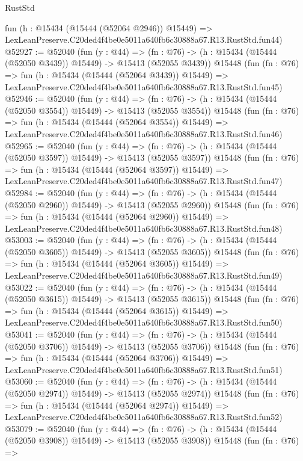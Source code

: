 \begin{lexlean}{RustStd}
\begin{coremodule}
    fun (h : @15434 (@15444 (@52064 @2946)) @15449) =>
    LexLeanPreserve.C20ded4f4be0e5011a640fb6c30888a67.R13.RustStd.fun44)
@52927 := @52040
    (fun (y : @44) =>
    (fn : @76) -> (h : @15434 (@15444 (@52050 @3439)) @15449) -> @15413 (@52055 @3439))
    @15448
    (fun (fn : @76) =>
    fun (h : @15434 (@15444 (@52064 @3439)) @15449) =>
    LexLeanPreserve.C20ded4f4be0e5011a640fb6c30888a67.R13.RustStd.fun45)
@52946 := @52040
    (fun (y : @44) =>
    (fn : @76) -> (h : @15434 (@15444 (@52050 @3554)) @15449) -> @15413 (@52055 @3554))
    @15448
    (fun (fn : @76) =>
    fun (h : @15434 (@15444 (@52064 @3554)) @15449) =>
    LexLeanPreserve.C20ded4f4be0e5011a640fb6c30888a67.R13.RustStd.fun46)
@52965 := @52040
    (fun (y : @44) =>
    (fn : @76) -> (h : @15434 (@15444 (@52050 @3597)) @15449) -> @15413 (@52055 @3597))
    @15448
    (fun (fn : @76) =>
    fun (h : @15434 (@15444 (@52064 @3597)) @15449) =>
    LexLeanPreserve.C20ded4f4be0e5011a640fb6c30888a67.R13.RustStd.fun47)
@52984 := @52040
    (fun (y : @44) =>
    (fn : @76) -> (h : @15434 (@15444 (@52050 @2960)) @15449) -> @15413 (@52055 @2960))
    @15448
    (fun (fn : @76) =>
    fun (h : @15434 (@15444 (@52064 @2960)) @15449) =>
    LexLeanPreserve.C20ded4f4be0e5011a640fb6c30888a67.R13.RustStd.fun48)
@53003 := @52040
    (fun (y : @44) =>
    (fn : @76) -> (h : @15434 (@15444 (@52050 @3605)) @15449) -> @15413 (@52055 @3605))
    @15448
    (fun (fn : @76) =>
    fun (h : @15434 (@15444 (@52064 @3605)) @15449) =>
    LexLeanPreserve.C20ded4f4be0e5011a640fb6c30888a67.R13.RustStd.fun49)
@53022 := @52040
    (fun (y : @44) =>
    (fn : @76) -> (h : @15434 (@15444 (@52050 @3615)) @15449) -> @15413 (@52055 @3615))
    @15448
    (fun (fn : @76) =>
    fun (h : @15434 (@15444 (@52064 @3615)) @15449) =>
    LexLeanPreserve.C20ded4f4be0e5011a640fb6c30888a67.R13.RustStd.fun50)
@53041 := @52040
    (fun (y : @44) =>
    (fn : @76) -> (h : @15434 (@15444 (@52050 @3706)) @15449) -> @15413 (@52055 @3706))
    @15448
    (fun (fn : @76) =>
    fun (h : @15434 (@15444 (@52064 @3706)) @15449) =>
    LexLeanPreserve.C20ded4f4be0e5011a640fb6c30888a67.R13.RustStd.fun51)
@53060 := @52040
    (fun (y : @44) =>
    (fn : @76) -> (h : @15434 (@15444 (@52050 @2974)) @15449) -> @15413 (@52055 @2974))
    @15448
    (fun (fn : @76) =>
    fun (h : @15434 (@15444 (@52064 @2974)) @15449) =>
    LexLeanPreserve.C20ded4f4be0e5011a640fb6c30888a67.R13.RustStd.fun52)
@53079 := @52040
    (fun (y : @44) =>
    (fn : @76) -> (h : @15434 (@15444 (@52050 @3908)) @15449) -> @15413 (@52055 @3908))
    @15448
    (fun (fn : @76) =>

\end{coremodule}
\end{lexlean}
